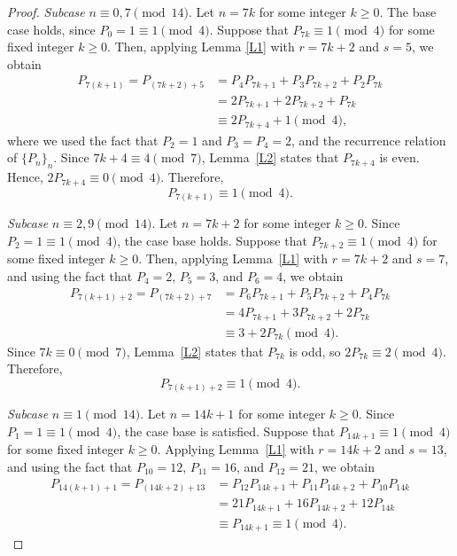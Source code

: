 \documentclass[10pt,a4paper]{amsart}
\begin{document}
\begin{proof}
	\smallskip
	\textit{Subcase} $n\equiv 0,7\pmod{14}$. Let $n=7k$ for some integer 
	$k\ge 0$. The base case holds, since $P_0=1\equiv 1\pmod{4}$. 
	Suppose that $P_{7k}\equiv 1\pmod{4}$ for some fixed integer
	$k\ge 0$. Then, applying Lemma \ref{L1} with $r=7k+2$ and $s=5$, we obtain
	\begin{align*}
		P_{7(k+1)} = P_{(7k+2)+5} 
		&= P_{4}P_{7k+1} + P_{3}P_{7k+2} 
		+ P_{2}P_{7k}\\
		&= 2P_{7k+1}+2P_{7k+2}+P_{7k}\\
		&\equiv 2P_{7k+4}+1\pmod{4},
	\end{align*}
	where we used the fact that $P_2=1$ and $P_3=P_4=2$, and the recurrence relation of $\{P_{n}\}_{n}$. Since $7k+4\equiv 4\pmod{7}$, 
	Lemma~\ref{L2} states that $P_{7k+4}$ is even. Hence, $2P_{7k+4}\equiv 0\pmod{4}$. Therefore,
	\begin{equation*}
		P_{7(k+1)}\equiv 1\pmod{4}.
	\end{equation*}
	
	\smallskip
	\textit{Subcase} $n\equiv 2,9\pmod{14}$. Let $n=7k+2$ for some integer 
	$k\ge 0$. Since $P_2=1\equiv 1\pmod{4}$, the case base holds. 
	Suppose that $P_{7k+2}\equiv 1\pmod{4}$ for some fixed integer $k\ge 0$. Then, 
	applying Lemma~\ref{L1} with $r=7k+2$ and $s=7$, and 
	using the fact that $P_4=2$, $P_5=3$, and $P_6=4$, we obtain
	\begin{align*}
		P_{7(k+1)+2} = P_{(7k+2)+7} 
		&= P_{6}P_{7k+1}+P_{5}P_{7k+2}
		+P_{4}P_{7k}\\
		&= 4P_{7k+1}+3P_{7k+2}+2P_{7k}\\
		&\equiv 3+2P_{7k}\pmod{4}.
	\end{align*}
	Since $7k\equiv 0\pmod{7}$, Lemma~\ref{L2} states that $P_{7k}$ 
	is odd, so $2P_{7k}\equiv 2\pmod{4}$. Therefore,
	\begin{equation*}
		P_{7(k+1)+2}\equiv 1\pmod{4}.
	\end{equation*}
	
	\smallskip
	\textit{Subcase} $n\equiv 1\pmod{14}$. Let $n=14k+1$ for some integer $k\ge 0$. Since $P_1=1\equiv 1\pmod{4}$, the case base is satisfied. Suppose that $P_{14k+1}\equiv 1\pmod{4}$ for some fixed integer $k\ge 0$. Applying 
	Lemma~\ref{L1} with $r=14k+2$ and $s=13$, and using the fact that 
	$P_{10}=12$, $P_{11}=16$, and $P_{12}=21$, we obtain
	\begin{align*}
		P_{14(k+1)+1} = P_{(14k+2)+13}
		&= P_{12}P_{14k+1}+P_{11}P_{14k+2}
		+P_{10}P_{14k}\\
		&= 21P_{14k+1}+16P_{14k+2}+12P_{14k}\\
		&\equiv P_{14k+1}\equiv 1\pmod{4}.
	\end{align*}
	

\end{proof}
\end{document}
